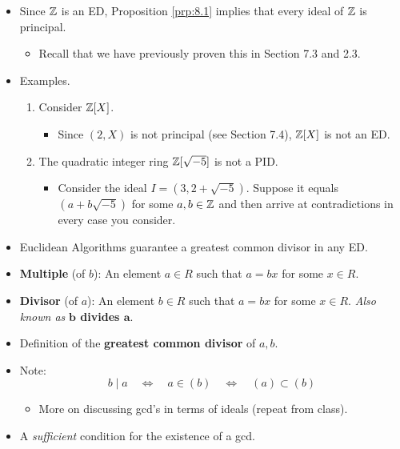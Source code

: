 \documentclass[../notes.tex]{subfiles}
\begin{document}
\begin{itemize}
\begin{proposition}
    \end{proposition}
    \item Since $\mathbb{Z}$ is an ED, Proposition \ref{prp:8.1} implies that every ideal of $\mathbb{Z}$ is principal.
    \begin{itemize}
        \item Recall that we have previously proven this in Section 7.3 and 2.3.
    \end{itemize}
    \item Examples.
    \begin{enumerate}
        \item Consider $\mathbb{Z}[X]$.
        \begin{itemize}
            \item Since $(2,X)$ is not principal (see Section 7.4), $\mathbb{Z}[X]$ is not an ED.
        \end{itemize}
        \item The quadratic integer ring $\mathbb{Z}[\sqrt{-5}]$ is not a PID.
        \begin{itemize}
            \item Consider the ideal $I=(3,2+\sqrt{-5})$. Suppose it equals $(a+b\sqrt{-5})$ for some $a,b\in\mathbb{Z}$ and then arrive at contradictions in every case you consider.
        \end{itemize}
    \end{enumerate}
    \item Euclidean Algorithms guarantee a greatest common divisor in any ED.
    \item \textbf{Multiple} (of $b$): An element $a\in R$ such that $a=bx$ for some $x\in R$.
    \item \textbf{Divisor} (of $a$): An element $b\in R$ such that $a=bx$ for some $x\in R$. \emph{Also known as} \textbf{$\bm{b}$ divides $\bm{a}$}.
    \item Definition of the \textbf{greatest common divisor} of $a,b$.
    \item Note:
    \begin{equation*}
        b \mid a
        \quad\Longleftrightarrow\quad
        a \in (b)
        \quad\Longleftrightarrow\quad
        (a) \subset (b)
    \end{equation*}
    \begin{itemize}
        \item More on discussing gcd's in terms of ideals (repeat from class).
    \end{itemize}
    \item A \emph{sufficient} condition for the existence of a gcd.

\end{itemize}
\end{document}
